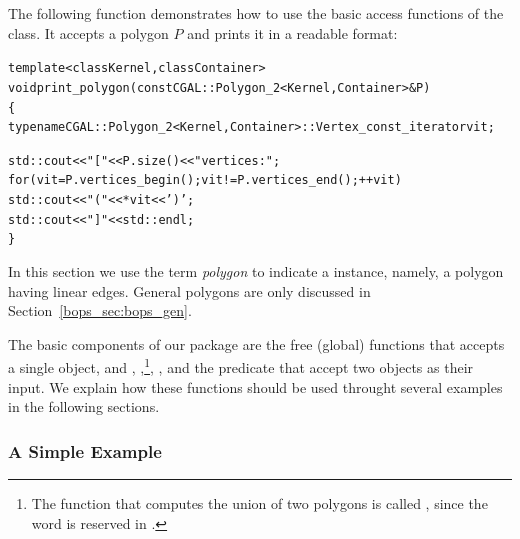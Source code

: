 The following function demonstrates how to use the basic access
functions of the  class. It accepts a polygon $P$ and
prints it in a readable format:
\begin{alltt}
template<class Kernel, class Container>
void print_polygon (const CGAL::Polygon_2<Kernel, Container>& P)
\{
  typename CGAL::Polygon_2<Kernel, Container>::Vertex_const_iterator  vit;

  std::cout << "[ " << P.size() << " vertices:";
  for (vit = P.vertices_begin(); vit != P.vertices_end(); ++vit)
    std::cout << " (" << *vit << ')';
  std::cout << " ]" << std::endl;
\}
\end{alltt}

In this section we use the term {\em polygon} to indicate a
 instance, namely, a polygon having linear
edges. General polygons are only discussed in
Section~\ref{bops_sec:bops_gen}.

The basic components of our package are the free (global) functions
 that accepts a single  object, and
, ,\footnote{The function that
computes the union of two polygons is called , since
the word  is reserved in \Cpp.}, ,
 and the predicate 
that accept two  objects as their input. We explain how
these functions should be used throught several examples in the
following sections.

\subsubsection*{A Simple Example}

